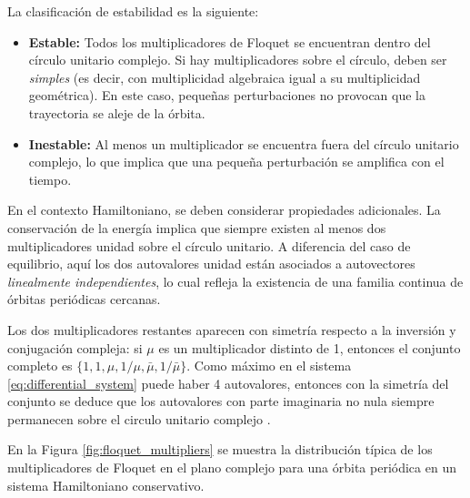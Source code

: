 La clasificación de estabilidad es la siguiente:

\begin{itemize}
    \item \textbf{Estable:} Todos los multiplicadores de Floquet se encuentran dentro del círculo
          unitario complejo. Si hay multiplicadores sobre el círculo, deben ser \emph{simples}
          (es decir, con multiplicidad algebraica igual a su multiplicidad geométrica). En este caso,
          pequeñas perturbaciones no provocan que la trayectoria se aleje de la órbita.

    \item \textbf{Inestable:} Al menos un multiplicador se encuentra fuera del círculo unitario
          complejo, lo que implica que una pequeña perturbación se amplifica con el tiempo.
\end{itemize}

En el contexto Hamiltoniano, se deben considerar propiedades adicionales. La conservación de la
energía implica que siempre existen al menos dos multiplicadores unidad sobre el círculo unitario.
A diferencia del caso de equilibrio, aquí los dos autovalores unidad están asociados a autovectores
\emph{linealmente independientes}, lo cual refleja la existencia de una familia continua de órbitas
periódicas cercanas.

Los dos multiplicadores restantes aparecen con simetría respecto a la inversión y conjugación compleja:
si $\mu$ es un multiplicador distinto de 1, entonces el conjunto completo es $\{1, 1, \mu, 1/\mu, \bar{\mu}, 1/\bar{\mu}\}$.
Como máximo en el sistema \eqref{eq:differential_system} puede haber 4 autovalores, entonces con la simetría del conjunto
se deduce que los autovalores con parte imaginaria no nula siempre permanecen sobre el circulo unitario complejo
\cite{meyer1992introduction}.

En la Figura \ref{fig:floquet_multipliers} se muestra la distribución típica de los multiplicadores de Floquet en el
plano complejo para una órbita periódica en un sistema Hamiltoniano conservativo.

